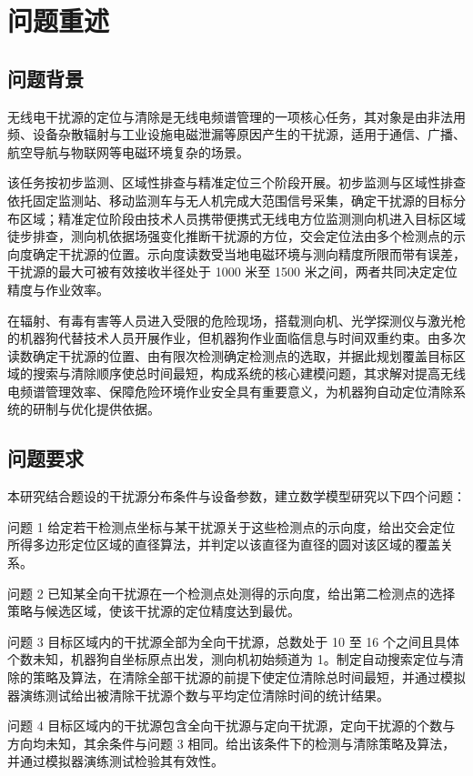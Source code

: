 \section{问题重述}

\subsection{问题背景}

无线电干扰源的定位与清除是无线电频谱管理的一项核心任务，其对象是由非法用频、设备杂散辐射与工业设施电磁泄漏等原因产生的干扰源，适用于通信、广播、航空导航与物联网等电磁环境复杂的场景。

该任务按初步监测、区域性排查与精准定位三个阶段开展。初步监测与区域性排查依托固定监测站、移动监测车与无人机完成大范围信号采集，确定干扰源的目标分布区域；精准定位阶段由技术人员携带便携式无线电方位监测测向机进入目标区域徒步排查，测向机依据场强变化推断干扰源的方位，交会定位法由多个检测点的示向度确定干扰源的位置。示向度读数受当地电磁环境与测向精度所限而带有误差，干扰源的最大可被有效接收半径处于 1000 米至 1500 米之间，两者共同决定定位精度与作业效率。

在辐射、有毒有害等人员进入受限的危险现场，搭载测向机、光学探测仪与激光枪的机器狗代替技术人员开展作业，但机器狗作业面临信息与时间双重约束。由多次读数确定干扰源的位置、由有限次检测确定检测点的选取，并据此规划覆盖目标区域的搜索与清除顺序使总时间最短，构成系统的核心建模问题，其求解对提高无线电频谱管理效率、保障危险环境作业安全具有重要意义，为机器狗自动定位清除系统的研制与优化提供依据。

\subsection{问题要求}

本研究结合题设的干扰源分布条件与设备参数，建立数学模型研究以下四个问题：

问题 1 给定若干检测点坐标与某干扰源关于这些检测点的示向度，给出交会定位所得多边形定位区域的直径算法，并判定以该直径为直径的圆对该区域的覆盖关系。

问题 2 已知某全向干扰源在一个检测点处测得的示向度，给出第二检测点的选择策略与候选区域，使该干扰源的定位精度达到最优。

问题 3 目标区域内的干扰源全部为全向干扰源，总数处于 10 至 16 个之间且具体个数未知，机器狗自坐标原点出发，测向机初始频道为 1。制定自动搜索定位与清除的策略及算法，在清除全部干扰源的前提下使定位清除总时间最短，并通过模拟器演练测试给出被清除干扰源个数与平均定位清除时间的统计结果。

问题 4 目标区域内的干扰源包含全向干扰源与定向干扰源，定向干扰源的个数与方向均未知，其余条件与问题 3 相同。给出该条件下的检测与清除策略及算法，并通过模拟器演练测试检验其有效性。
